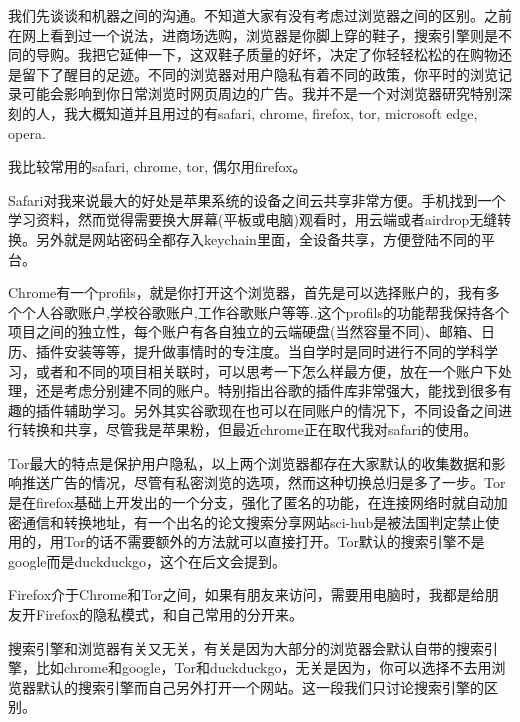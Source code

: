 \documentclass[
]{book}
\begin{document}
我们先谈谈和机器之间的沟通。不知道大家有没有考虑过浏览器之间的区别。之前在网上看到过一个说法，进商场选购，浏览器是你脚上穿的鞋子，搜索引擎则是不同的导购。我把它延伸一下，这双鞋子质量的好坏，决定了你轻轻松松的在购物还是留下了醒目的足迹。不同的浏览器对用户隐私有着不同的政策，你平时的浏览记录可能会影响到你日常浏览时网页周边的广告。我并不是一个对浏览器研究特别深刻的人，我大概知道并且用过的有safari, chrome, firefox, tor, microsoft edge, opera.

我比较常用的safari, chrome, tor, 偶尔用firefox。

Safari对我来说最大的好处是苹果系统的设备之间云共享非常方便。手机找到一个学习资料，然而觉得需要换大屏幕(平板或电脑)观看时，用云端或者airdrop无缝转换。另外就是网站密码全都存入keychain里面，全设备共享，方便登陆不同的平台。

Chrome有一个profils，就是你打开这个浏览器，首先是可以选择账户的，我有多个个人谷歌账户,学校谷歌账户,工作谷歌账户等等..这个profils的功能帮我保持各个项目之间的独立性，每个账户有各自独立的云端硬盘(当然容量不同)、邮箱、日历、插件安装等等，提升做事情时的专注度。当自学时是同时进行不同的学科学习，或者和不同的项目相关联时，可以思考一下怎么样最方便，放在一个账户下处理，还是考虑分别建不同的账户。特别指出谷歌的插件库非常强大，能找到很多有趣的插件辅助学习。另外其实谷歌现在也可以在同账户的情况下，不同设备之间进行转换和共享，尽管我是苹果粉，但最近chrome正在取代我对safari的使用。

Tor最大的特点是保护用户隐私，以上两个浏览器都存在大家默认的收集数据和影响推送广告的情况，尽管有私密浏览的选项，然而这种切换总归是多了一步。Tor是在firefox基础上开发出的一个分支，强化了匿名的功能，在连接网络时就自动加密通信和转换地址，有一个出名的论文搜索分享网站sci-hub是被法国判定禁止使用的，用Tor的话不需要额外的方法就可以直接打开。Tor默认的搜索引擎不是google而是duckduckgo，这个在后文会提到。

Firefox介于Chrome和Tor之间，如果有朋友来访问，需要用电脑时，我都是给朋友开Firefox的隐私模式，和自己常用的分开来。

搜索引擎和浏览器有关又无关，有关是因为大部分的浏览器会默认自带的搜索引擎，比如chrome和google，Tor和duckduckgo，无关是因为，你可以选择不去用浏览器默认的搜索引擎而自己另外打开一个网站。这一段我们只讨论搜索引擎的区别。
\end{document}
